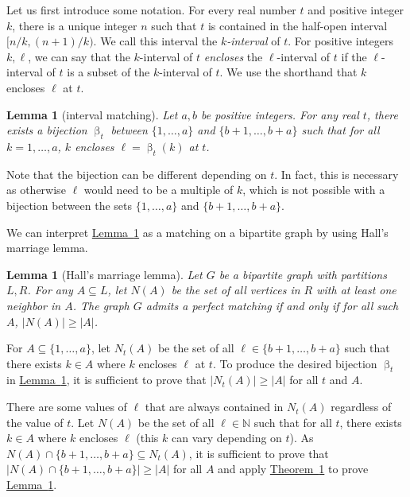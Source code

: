 \documentclass[11pt]{article}
\numberwithin{equation}{section}
\newtheorem{lemma}[theorem]{Lemma}
\theoremstyle{definition}
\theoremstyle{plain}
\newcommand{\expref}[2]{\hyperref[#2]{#1~\ref{#2}}}
\newcommand{\Nbr}{N}
\newcommand{\A}{A}
\DeclareMathOperator{\bij}{\beta}
\begin{document}
Let us first introduce some notation. For every real number $t$ and positive integer $k$, there is a unique integer $n$ such that $t$ is contained in the half-open interval $[n/k, (n+1)/k)$. We call this interval the \emph{$k$-interval} of $t$. For positive integers $k,\ell$, we can say that the $k$-interval of $t$ \emph{encloses} the $\ell$-interval of $t$ if the $\ell$-interval of $t$ is a subset of the $k$-interval of $t$. We use the shorthand that $k$ encloses $\ell$ at $t$.

\begin{lemma}[interval matching]
    \label{lemma:intervalmatching}
    Let $a,b$ be positive integers. For any real $t$, there exists a bijection $\bij_t$ between $\{1,\dots,a\}$ and $\{b+1,\dots,b+a\}$ such that for all $k=1,\dots,a$, $k$ encloses $\ell=\bij_t(k)$ at $t$.
\end{lemma}
Note that the bijection can be different depending on $t$. In fact, this is necessary as otherwise $\ell$ would need to be a multiple of $k$, which is not possible with a bijection between the sets $\{1,\dots,a\}$ and $\{b+1,\dots,b+a\}$.

We can interpret \expref{Lemma}{lemma:intervalmatching} as a matching on a bipartite graph by using Hall's marriage lemma.

\begin{lemma}[Hall's marriage lemma]
    \label{thm:hall}
    Let $G$ be a bipartite graph with partitions $L,R$. For any $\A\subseteq L$, let $\Nbr(\A)$ be the set of all vertices in $R$ with at least one neighbor in $\A$. The graph $G$ admits a perfect matching if and only if for all such $\A$, $|\Nbr(\A)|\ge |\A|$. 
\end{lemma}

For $\A\subseteq \{1,\dots,a\}$, let $\Nbr_t(\A)$ be the set of all $\ell\in\{b+1,\dots,b+a\}$ such that there exists $k\in \A$ where $k$ encloses $\ell$ at $t$. To produce the desired bijection $\bij_t$ in \expref{Lemma}{lemma:intervalmatching}, it is sufficient to prove that $|\Nbr_t(\A)|\ge |\A|$ for all $t$ and $\A$.

There are some values of $\ell$ that are always contained in $\Nbr_t(\A)$ regardless of the value of $t$. Let $\Nbr(\A)$ be the set of all $\ell\in\mathbb{N}$ such that for all $t$, there exists $k\in \A$ where $k$ encloses $\ell$ (this $k$ can vary depending on $t$). As $\Nbr(\A)\cap \{b+1,\dots,b+a\}\subseteq \Nbr_t(\A)$, it is sufficient to prove that $|\Nbr(\A)\cap \{b+1,\dots,b+a\}|\ge |\A|$ for all $\A$ and apply \expref{Theorem}{thm:hall} to prove \expref{Lemma}{lemma:intervalmatching}.
\end{document}

